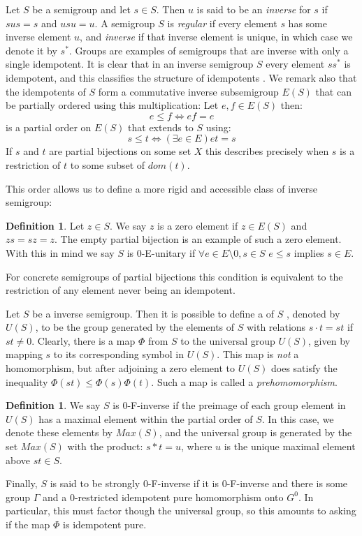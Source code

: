 \documentclass[11pt,a4paper]{amsart}
\theoremstyle{plain}
\theoremstyle{definition}%
\newtheorem{definition}[theorem]{Definition}%
\theoremstyle{remark}%
\begin{document}
Let $S$ be a semigroup and let $s \in S$. Then $u$ is said to be an \textit{inverse} for $s$ if $sus=s$ and $usu=u$. A semigroup $S$ is \textit{regular} if every element $s$ has some inverse element $u$, and \textit{inverse} if that inverse element is unique, in which case we denote it by $s^{*}$. Groups are examples of semigroups that are inverse with only a single idempotent. It is clear that in an inverse semigroup $S$ every element $ss^{*}$ is idempotent, and this classifies the structure of idempotents \cite{}. We remark also that the idempotents of $S$ form a commutative inverse subsemigroup $E(S)$ that can be partially ordered using this multiplication: Let $e,f \in E(S)$ then:
\begin{equation*}
e \leq f \Leftrightarrow ef=e
\end{equation*}
is a partial order on $E(S)$ that extends to $S$ using:
\begin{equation*}
s \leq t \Leftrightarrow (\exists e \in E) et=s
\end{equation*}
If $s$ and $t$ are partial bijections on some set $X$ this describes precisely when $s$ is a restriction of $t$ to some subset of $dom(t)$.

This order allows us to define a more rigid and accessible class of inverse semigroup:

\begin{definition}
Let $z \in S$. We say $z$ is a zero element if $z \in E(S)$ and $zs=sz=z$. The empty partial bijection is an example of such a zero element. With this in mind we say $S$ is 0-E-unitary if $\forall e \in E\setminus 0, s \in S$ $e \leq s$ implies $s \in E$.
\end{definition}

For concrete semigroups of partial bijections this condition is equivalent to the restriction of any element never being an idempotent.

Let $S$ be a inverse semigroup. Then it is possible to define a  of $S$ \cite{}, denoted by $U(S)$, to be the group generated by the elements of $S$ with relations $s\cdot t = st$ if $st \not = 0$. Clearly, there is a map $\Phi$ from $S$ to the universal group $U(S)$, given by mapping $s$ to its corresponding symbol in $U(S)$. This map is \textit{not} a homomorphism, but after adjoining a zero element to $U(S)$ does satisfy the inequality $\Phi(st) \leq \Phi(s)\Phi(t)$. Such a map is called a \textit{prehomomorphism}. 

\begin{definition}
We say $S$ is 0-F-inverse if the preimage of each group element in $U(S)$ has a maximal element within the partial order of $S$. In this case, we denote these elements by $Max(S)$, and the universal group is generated by the set $Max(S)$ with the product: $s\ast t = u$, where $u$ is the unique maximal element above $st \in S$. 

Finally, $S$ is said to be strongly $0$-F-inverse if it is $0$-F-inverse and there is some group $\Gamma$ and a $0$-restricted idempotent pure homomorphism onto $G^{0}$. In particular, this must factor though the universal group, so this amounts to asking if the map $\Phi$ is idempotent pure.
\end{definition}
\end{document}
